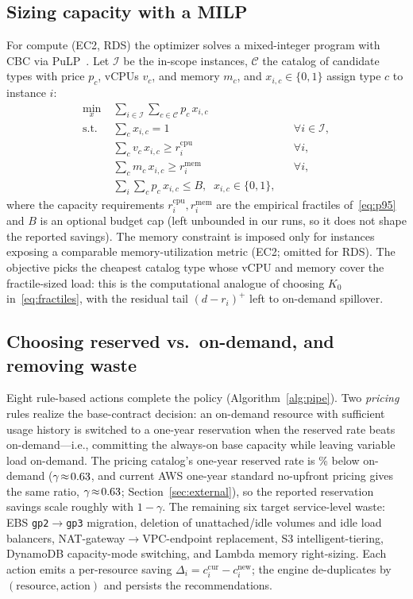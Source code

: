 \documentclass[10pt,journal]{IEEEtran}
\newcommand{\pos}[1]{\left(#1\right)^{+}}
\begin{document}
\subsection{Sizing capacity with a MILP}
For compute (EC2, RDS) the optimizer solves a mixed-integer program with
CBC via PuLP~\cite{mitchell2011pulp}. Let $\mathcal{I}$ be the in-scope
instances, $\mathcal{C}$ the catalog of candidate types with price $p_c$,
vCPUs $v_c$, and memory $m_c$, and $x_{i,c}\in\{0,1\}$ assign type $c$ to
instance $i$:
\begin{align}
\min_{x}\;& \sum_{i\in\mathcal{I}}\sum_{c\in\mathcal{C}} p_c\,x_{i,c}
\label{eq:milp}\\
\text{s.t.}\;& \textstyle\sum_{c} x_{i,c}=1 && \forall i\in\mathcal{I},\nonumber\\
& \textstyle\sum_{c} v_c\,x_{i,c}\ge r_i^{\mathrm{cpu}} && \forall i,\nonumber\\
& \textstyle\sum_{c} m_c\,x_{i,c}\ge r_i^{\mathrm{mem}} && \forall i,\nonumber\\
& \textstyle\sum_{i}\sum_{c} p_c\,x_{i,c}\le B,\;\; x_{i,c}\in\{0,1\},\nonumber
\end{align}
where the capacity requirements $r_i^{\mathrm{cpu}},r_i^{\mathrm{mem}}$ are
the empirical fractiles of~\eqref{eq:p95} and $B$ is an optional budget cap
(left unbounded in our runs, so it does not shape the reported savings). The
memory constraint is imposed only for instances exposing a comparable
memory-utilization metric (EC2; omitted for RDS). The objective picks the
cheapest catalog type whose vCPU and memory cover the fractile-sized load:
this is the computational analogue of choosing $K_0$
in~\eqref{eq:fractiles}, with the residual tail $\pos{d-r_i}$ left to
on-demand spillover.

\subsection{Choosing reserved vs.\ on-demand, and removing waste}
Eight rule-based actions complete the policy (Algorithm~\ref{alg:pipe}). Two
\emph{pricing} rules realize the base-contract decision: an on-demand
resource with sufficient usage history is switched to a one-year reservation
when the reserved rate beats on-demand---i.e., committing the always-on base
capacity while leaving variable load on-demand. The pricing catalog's
one-year reserved rate is \rsvDiscountPct\% below on-demand
($\gamma\!\approx\!0.63$, and current AWS one-year standard
no-upfront pricing gives the same ratio, $\gamma\!\approx\!0.63$;
Section~\ref{sec:external}), so the reported reservation savings scale
roughly with $1-\gamma$. The remaining six target service-level waste:
EBS \texttt{gp2}$\rightarrow$\texttt{gp3} migration, deletion of
unattached/idle volumes and idle load balancers,
NAT-gateway$\rightarrow$VPC-endpoint replacement, S3 intelligent-tiering,
DynamoDB capacity-mode switching, and Lambda memory right-sizing. Each
action emits a per-resource saving
$\Delta_i=c_i^{\text{cur}}-c_i^{\text{new}}$; the engine de-duplicates by
$(\text{resource},\text{action})$ and persists the recommendations.
\end{document}
